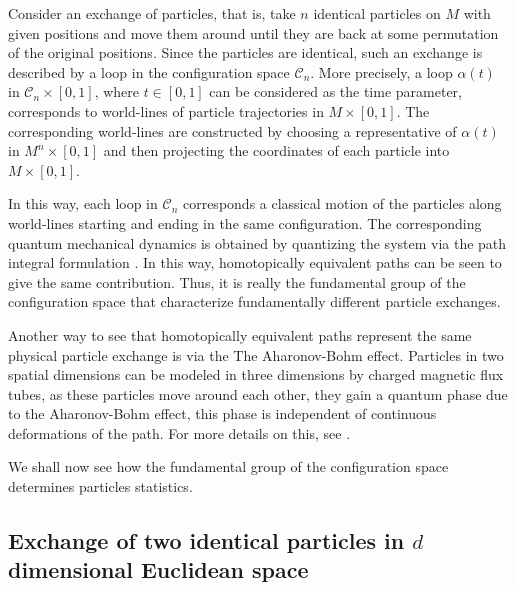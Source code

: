 \documentclass[a4paper,10pt,oneside]{book}
\theoremstyle{plain}
\theoremstyle{definition}
\theoremstyle{remark}
\begin{document}
Consider an exchange of particles, that is, take $n$ identical particles on $M$ with given positions and move them around until they are back at some permutation of the original positions. Since the particles are identical, such an exchange is described by a loop in the configuration space $\mathcal{C}_n$. More precisely, a loop $\alpha(t)$ in $\mathcal{C}_n\times[0,1]$, where $t \in [0,1]$ can be considered as the time parameter, corresponds to world-lines of particle trajectories in $M\times[0,1]$. The corresponding world-lines are constructed by choosing a representative of $\alpha(t)$ in $M^n\times[0,1]$ and then projecting the coordinates of each particle into $M\times[0,1]$.

In this way, each loop in $\mathcal{C}_n$ corresponds a classical motion of the particles along world-lines starting and ending in the same configuration. The corresponding quantum mechanical dynamics is obtained by quantizing the system via the path integral formulation \cite{feynmann path integral,nakahara,feynmann path integrals indistinguishable particles}. In this way, homotopically equivalent paths can be seen to give the same contribution. Thus, it is really the fundamental group of the configuration space that characterize fundamentally different particle exchanges.

Another way to see that homotopically equivalent paths represent the same physical particle exchange is via the The Aharonov-Bohm effect. Particles in two spatial dimensions can be modeled in three dimensions by charged magnetic flux tubes, as these particles move around each other, they gain a quantum phase due to the Aharonov-Bohm effect, this phase is independent of continuous deformations of the path. For more details on this, see \cite{bonderson,configuration spaces}.

We shall now see how the fundamental group of the configuration space determines particles statistics.


\subsection{Exchange of two identical particles in $d$ dimensional Euclidean space}
\end{document}
